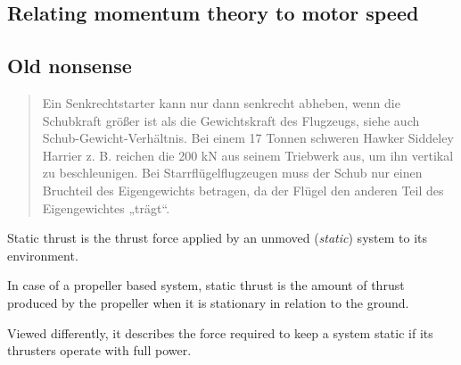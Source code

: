 

\subsection{Relating momentum theory to motor speed}
\label{subsec:momentum_theory_to_motor}














\subsection{Old nonsense}


\begin{quote}
Ein Senkrechtstarter kann nur dann senkrecht abheben, wenn die Schubkraft größer ist als die Gewichtskraft des Flugzeugs, siehe auch Schub-Gewicht-Verhältnis. Bei einem 17 Tonnen schweren Hawker Siddeley Harrier z. B. reichen die 200 kN aus seinem Triebwerk aus, um ihn vertikal zu beschleunigen. Bei Starrflügelflugzeugen muss der Schub nur einen Bruchteil des Eigengewichts betragen, da der Flügel den anderen Teil des Eigengewichtes „trägt“.
\end{quote}




Static thrust %
is the thrust force applied by an unmoved (\textit{static}) system to its environment.

In case of a propeller based system, static thrust is the amount of thrust 
produced by the propeller when it is stationary in relation to the ground.

Viewed differently, it describes the force required to keep a system static if its 
thrusters operate with full power. 

